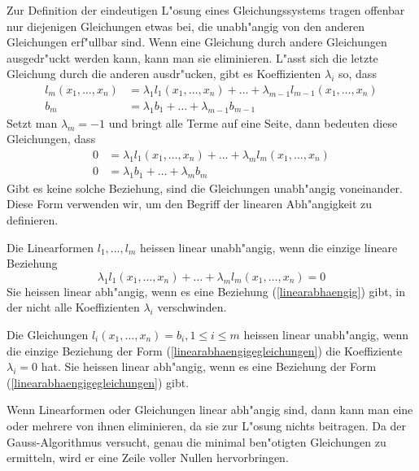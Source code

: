 Zur Definition der eindeutigen L"osung eines Gleichungssystems 
tragen offenbar nur diejenigen Gleichungen etwas bei, die unabh"angig
von den anderen Gleichungen erf"ullbar sind. Wenn eine Gleichung
durch andere Gleichungen ausgedr"uckt werden kann, kann man sie
eliminieren. L"asst sich die letzte Gleichung durch die
anderen ausdr"ucken, gibt es Koeffizienten $\lambda_i$ so, dass
\begin{equation*}
\begin{aligned}
l_m(x_1,\dots,x_n)&=\lambda_1 l_1(x_1,\dots,x_n)+\dots+\lambda_{m-1}l_{m-1}(x_1,\dots, x_n)\\
b_m&=\lambda_1b_1+\dots+\lambda_{m-1}b_{m-1}
\end{aligned}
\end{equation*}
Setzt man $\lambda_m=-1$ und bringt alle Terme auf eine Seite,
dann bedeuten diese Gleichungen, dass
\begin{equation}
\begin{aligned}
0&=\lambda_1l_1(x_1,\dots,x_n)+\dots+\lambda_ml_m(x_1,\dots,x_n)\\
0&=\lambda_1b_1+\dots+\lambda_mb_m
\end{aligned}
\label{linearabhaengigegleichungen}
\end{equation}
Gibt es keine solche Beziehung, sind die Gleichungen unabh"angig
voneinander.
Diese Form verwenden wir, um den Begriff der linearen Abh"angigkeit
zu definieren.
\begin{definition}
Die Linearformen $l_1,\dots,l_m$ heissen linear unabh"angig,
wenn die einzige lineare Beziehung
\begin{equation}
\lambda_1l_1(x_1,\dots,x_n)+\dots+\lambda_ml_m(x_1,\dots,x_n)=0
\label{linearabhaengig}
\end{equation}
Sie heissen linear abh"angig, wenn es eine Beziehung (\ref{linearabhaengig})
gibt, in der nicht alle Koeffizienten $\lambda_i$ verschwinden.

Die Gleichungen $l_i(x_1,\dots,x_n)=b_i,1\le i\le m$ heissen linear unabh"angig,
wenn  die einzige Beziehung der Form (\ref{linearabhaengigegleichungen})
die Koeffiziente $\lambda_i=0$ hat. Sie heissen linear abh"angig, wenn
es eine Beziehung der Form (\ref{linearabhaengigegleichungen}) gibt.
\end{definition}

Wenn Linearformen oder Gleichungen linear abh"angig sind, dann kann
man eine oder mehrere von ihnen eliminieren, da sie zur L"osung nichts
beitragen.
Da der Gauss-Algorithmus versucht, genau die minimal ben"otigten Gleichungen
zu ermitteln, wird er eine Zeile voller Nullen hervorbringen.

